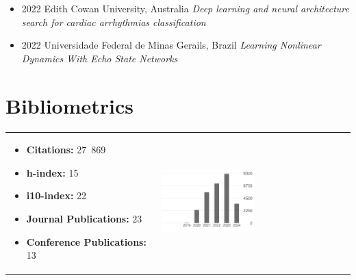 \documentclass[10pt,A4]{article} %
\begin{document}
\begin{itemize}

    \item {}
    { 2022 }
    {  }
    { Edith Cowan University, Australia }
    { {\it Deep learning and neural architecture search for cardiac arrhythmias classification } }

    \item {}
    { 2022 }
    {  }
    { Universidade Federal de Minas Gerails, Brazil }
    { {\it Learning Nonlinear Dynamics With Echo State Networks } }

\end{itemize}

\section{Bibliometrics}

\hspace{-10pt}
\begin{tabular}{ll}
\begin{minipage}{0.6\textwidth}
\begin{itemize}
\item \textbf{Citations:} 27\, 869
 \item \textbf{h-index:} 15
 \item \textbf{i10-index:} 22
 \item \textbf{Journal Publications:} 23
\item \textbf{Conference Publications:} 13
\end{itemize}\end{minipage}
    &
\begin{minipage}{0.4\textwidth}
\includegraphics[width=0.5\textwidth]{citation-graph}
\end{minipage}
\end{tabular}



\begin{flushright}
\end{flushright}
\end{document}
